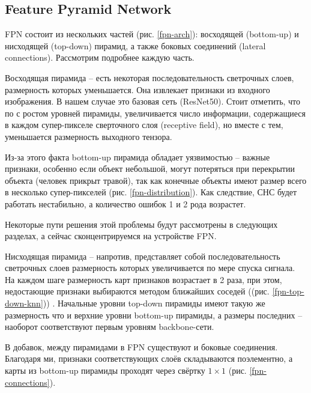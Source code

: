 \subsection{Feature Pyramid Network} \label{sect-5-2}

FPN состоит из нескольких частей (рис. \ref{fpn-arch}): восходящей (bottom-up) и нисходящей (top-down) пирамид, а также боковых соединений (lateral connections). Рассмотрим подробнее каждую часть.


Восходящая пирамида -- есть некоторая последовательность светрочных слоев, размерность которых уменьшается. Она  извлекает признаки из входного изображения. В нашем случае это базовая сеть (ResNet50). Стоит отметить, что по с ростом уровней пирамиды, увеличивается число информации, содержащиеся в каждом супер-пикселе сверточного слоя (receptive field), но вместе с тем, уменьшается размерность выходного тензора.

Из-за этого факта bottom-up пирамида обладает уязвимостью -- важные признаки, особенно если объект небольшой, могут потеряться при перекрытии объекта (человек прикрыт травой), так как конечные объекты имеют размер всего в несколько супер-пикселей (рис. \ref{fpn-distribution}). Как следствие, СНС будет работать нестабильно, а количество ошибок 1 и 2 рода возрастет. 


Некоторые пути решения этой проблемы будут рассмотрены в следующих разделах, а сейчас сконцентрируемся на устройстве FPN.

Нисходящая пирамида -- напротив, представляет собой последовательность светрочных слоев размерность которых увеличивается по мере спуска сигнала. На каждом шаге размерность карт признаков возрастает в 2 раза, при этом, недостающие признаки выбираются методом ближайших соседей ((рис. \ref{fpn-top-down-knn})) \cite{lib-knn}. Начальные уровни top-down пирамиды имеют такую же размерность что и верхние уровни bottom-up пирамиды, а размеры последних -- наоборот соответствуют первым уровням backbone-сети.


В добавок, между пирамидами в FPN существуют и боковые соединения. Благодаря ми, признаки соответствующих слоёв складываются поэлементно, а карты из bottom-up пирамиды проходят через свёртку $1 \times 1$ (рис. \ref{fpn-connections}).


